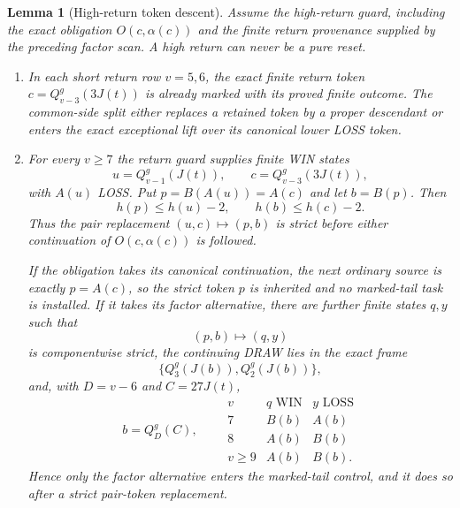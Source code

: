 \documentclass[11pt]{article}
\newtheorem{lemma}[theorem]{Lemma}
\begin{document}
\begin{lemma}[High-return token descent]\label{lem:high-return-pay}
Assume the high-return guard, including the exact obligation
$O(c,\alpha(c))$ and the finite return provenance supplied by the preceding
factor scan. A high return can never be a pure reset.
\begin{enumerate}[label=(\alph*)]
\item In each short return row $v=5,6$, the exact finite return token
      $c=Q_{v-3}^g(3J(t))$ is already marked with its proved finite outcome.
      The common-side split either replaces a retained token by a proper
      descendant or enters the exact exceptional lift over its canonical
      lower LOSS token.
\item For every $v\ge7$ the return guard supplies finite WIN states
\[
 u=Q_{v-1}^g(J(t)),\qquad c=Q_{v-3}^g(3J(t)),
\]
with $A(u)$ LOSS. Put $p=B(A(u))=A(c)$ and let $b=B(p)$. Then
\[
 h(p)\le h(u)-2,\qquad h(b)\le h(c)-2.
\]
Thus the pair replacement $(u,c)\mapsto(p,b)$ is strict before either
continuation of $O(c,\alpha(c))$ is followed.

If the obligation takes its canonical continuation, the next ordinary
source is exactly $p=A(c)$, so the strict token $p$ is inherited and no
marked-tail task is installed. If it takes its factor alternative, there are
further finite states $q,y$ such that
\[
 (p,b)\longmapsto(q,y)
\]
is componentwise strict, the continuing DRAW lies in the exact frame
\[
 \{Q_3^g(J(b)),Q_2^g(J(b))\},
\]
and, with $D=v-6$ and $C=27J(t)$,
\[
 b=Q_D^g(C),\qquad
\begin{array}{c|cc}
 v&q\text{ WIN}&y\text{ LOSS}\\ \hline
 7&B(b)&A(b)\\
 8&A(b)&B(b)\\
 v\ge9&A(b)&B(b).
\end{array}
\]
Hence only the factor alternative enters the marked-tail control, and it
does so after a strict pair-token replacement.
\end{enumerate}
\end{lemma}
\end{document}
